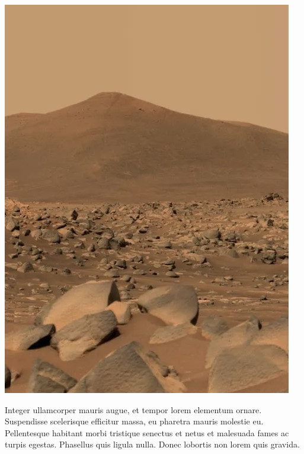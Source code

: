 \documentclass[./main.tex]{subfiles}
\begin{document}
\nolinenumbers

\newpage
\renewcommand{\headrulewidth}{0pt}
\thispagestyle{fancy}
\fancyhf{} %
\fancyfoot{} %
\fancyfoot[C]{\thepage}

\par \hfill
\vspace{40mm}
\begin{adjustwidth}{45pt}{45pt}
\begin{center}
    \includegraphics[scale=0.7]{figs/mars.jpg}\\
\end{center}
\vspace{10mm}
\noindent \textsf{Integer ullamcorper mauris augue, et tempor lorem elementum ornare. Suspendisse scelerisque efficitur massa, eu pharetra mauris molestie eu. Pellentesque habitant morbi tristique senectus et netus et malesuada fames ac turpis egestas. Phasellus quis ligula nulla. Donec lobortis non lorem quis gravida.}
\end{adjustwidth}
\clearpage
\end{document}
